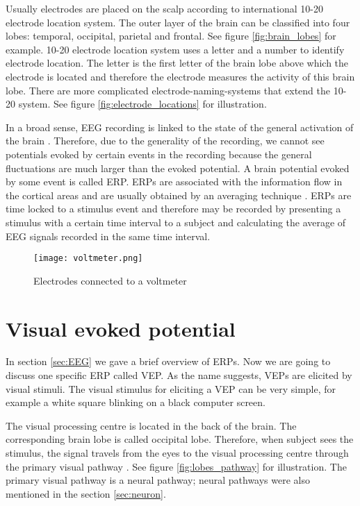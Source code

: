 Usually electrodes are placed on the scalp according to international 10-20 electrode location system. The outer layer of the brain can be classified into four lobes: temporal, occipital, parietal and frontal. See figure \ref{fig:brain_lobes} for example. 10-20 electrode location system uses a letter and a number to identify electrode location. The letter is the first letter of the brain lobe above which the electrode is located and therefore the electrode measures the activity of this brain lobe. There are more complicated electrode-naming-systems that extend the 10-20 system. See figure \ref{fig:electrode_locations} for illustration.

In a broad sense, \gls{EEG} recording is linked to the state of the general activation of the brain \cite{VEP}. Therefore, due to the generality of the recording, we cannot see potentials evoked by certain events in the recording because the general fluctuations are much larger than the evoked potential. A brain potential evoked by some event is called \gls{ERP}. \glspl{ERP} are associated with the information flow in the cortical areas and are usually obtained by an averaging technique \cite{ERP}. \glspl{ERP} are time locked to a stimulus event and therefore may be recorded by presenting a stimulus with a certain time interval to a subject and calculating the average of \gls{EEG} signals recorded in the same time interval.

\begin{figure}[h]
	\centering
	\texttt{[image: voltmeter.png]}
	\caption{Electrodes connected to a voltmeter \cite[p.~120]{ERP}}
	\label{fig:voltmeter}
\end{figure}

\section{Visual evoked potential}

In section \ref{sec:EEG} we gave a brief overview of \glspl{ERP}. Now we are going to discuss one specific \gls{ERP} called \gls{VEP}. As the name suggests, \glspl{VEP} are elicited by visual stimuli. The visual stimulus for eliciting a \gls{VEP} can be very simple, for example a white square blinking on a black computer screen.

The visual processing centre is located in the back of the brain. The corresponding brain lobe is called occipital lobe. Therefore, when subject sees the stimulus, the signal travels from the eyes to the visual processing centre through the primary visual pathway \cite{neuroscience}. See figure \ref{fig:lobes_pathway} for illustration. The primary visual pathway is a neural pathway; neural pathways were also mentioned in the section \ref{sec:neuron}.

